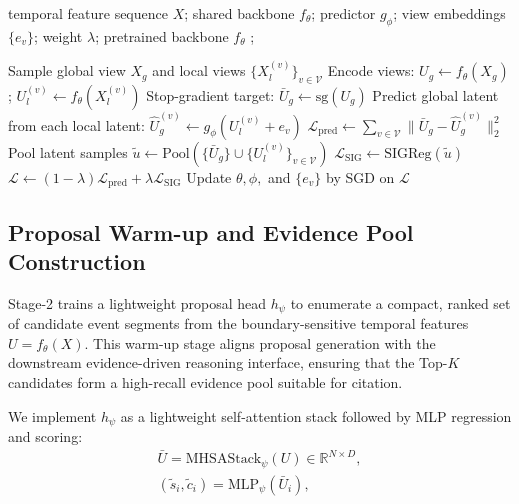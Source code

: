 \documentclass{article}
\theoremstyle{plain}
\theoremstyle{definition}
\theoremstyle{remark}
\begin{document}
\begin{algorithm}[tb]
  \caption{Predictive Temporal Perception via Multi-view Latent Prediction}
  \label{alg:perception}
  \begin{algorithmic}
     temporal feature sequence $X$;
     shared backbone $f_{\theta}$; predictor $g_{\phi}$; view embeddings $\{e_v\}$; weight $\lambda$;
     pretrained backbone $f_{\theta}$ ;

    \REPEAT
      \STATE Sample global view $X_g$ and local views $\{X_l^{(v)}\}_{v\in\mathcal{V}}$
      \STATE Encode views: $U_g \leftarrow f_{\theta}(X_g)$; $U_l^{(v)} \leftarrow f_{\theta}(X_l^{(v)})$
      \STATE Stop-gradient target: $\bar{U}_g \leftarrow \mathrm{sg}(U_g)$
      \STATE Predict global latent from each local latent:
        \STATE $\hat{U}_g^{(v)} \leftarrow g_{\phi}\!\left(U_l^{(v)} + e_v\right)$
      \ENDFOR
      \STATE $\mathcal{L}_{\mathrm{pred}} \leftarrow \sum_{v\in\mathcal{V}} \|\bar{U}_g - \hat{U}_g^{(v)}\|_2^2$
      \STATE Pool latent samples $\tilde{u} \leftarrow \mathrm{Pool}(\{\bar{U}_g\}\cup\{U_l^{(v)}\}_{v\in\mathcal{V}})$
      \STATE $\mathcal{L}_{\mathrm{SIG}} \leftarrow \mathrm{SIGReg}(\tilde{u})$
      \STATE $\mathcal{L} \leftarrow (1-\lambda)\mathcal{L}_{\mathrm{pred}} + \lambda\mathcal{L}_{\mathrm{SIG}}$
      \STATE Update $\theta, \phi,$ and $\{e_v\}$ by SGD on $\mathcal{L}$
  \end{algorithmic}
\end{algorithm}


\subsection{Proposal Warm-up and Evidence Pool Construction}
\label{sec:evidence_pool}

Stage-2 trains a lightweight proposal head $h_\psi$ to enumerate a compact, ranked set of candidate
event segments from the boundary-sensitive temporal features $U=f_\theta(X)$. This warm-up stage
aligns proposal generation with the downstream evidence-driven reasoning interface, ensuring that
the Top-$K$ candidates form a high-recall evidence pool suitable for citation.

We implement $h_{\psi}$ as a lightweight self-attention stack followed by MLP regression and scoring:
\begin{equation}
\begin{gathered}
\bar{U}=\mathrm{MHSAStack}_{\psi}(U)\in\mathbb{R}^{N\times D},\\
(\tilde{s}_i,\tilde{c}_i)=\mathrm{MLP}_{\psi}(\bar{U}_i),
\end{gathered}
\label{eq:prop_head}
\end{equation}
\end{document}
